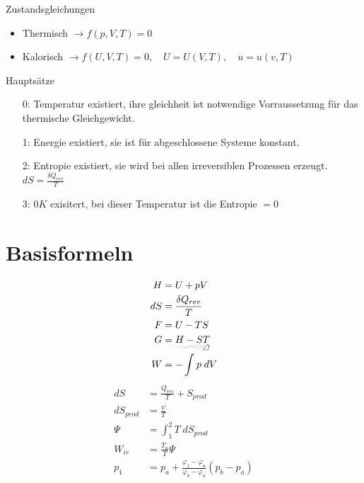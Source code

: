 \documentclass[twocolumn]{article}
\begin{document}
Zustandsgleichungen
\begin{itemize}
	\item Thermisch $\rightarrow f(p, V, T) = 0$ 
	\item Kalorisch $\rightarrow f(U, V, T) = 0, \quad  U = U(V,T), \quad u = u(v,T)$ 
\end{itemize}

Hauptsätze
\begin{itemize}
	\item[0:] Temperatur existiert, ihre gleichheit ist notwendige Vorraussetzung für das thermische Gleichgewicht. 
	\item[1:] Energie existiert, sie ist für abgeschlossene Systeme konstant.  
	\item[2:] Entropie existiert, sie wird bei allen irreversiblen Prozessen erzeugt. $dS = \frac{\delta Q_{rev}}{T}$
	\item[3:] $0K$ exisitert, bei dieser Temperatur ist die Entropie $= 0$ 
\end{itemize}

%                                                                

\section{Basisformeln}

\begin{multicols}{2}
\begin{align*}
	H 	&=	U + pV 				\\ 	
       	dS 	&=	\frac{\delta Q_{rev}}{T}	\\
	F 	&=	U-TS 				\\
	G 	&=	\underrightswishingghost{H-ST}	\\
	W 	&=	-\int_{}^{} p\; dV		\\
	\end{align*}
	\begin{align*}
       	dS 		&=  	\frac{Q_{rev}}{T} + S_{prod}	\\
	dS_{prod}	&=	\frac{\psi}{T} 			\\
	\Psi 		&= 	\int_{1}^{2} T\; dS_{prod}	\\
	W_{ir}		&=	\frac{T_u}{T}\Psi		\\
	p_1 		&= p_a  + \frac{\varphi_1 - \varphi_a}{\varphi_b- \varphi_a}(p_b - p_a) \\
\end{align*}
\end{multicols}
\end{document}
